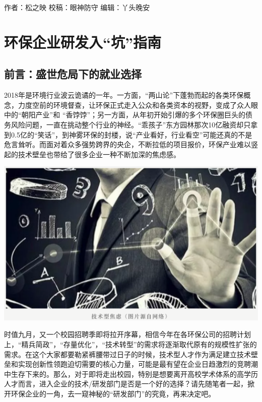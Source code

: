 \documentclass[]{book}
\begin{document}
作者：松之映
校稿：眼神防守
编辑：丫头晚安

\hypertarget{ux73afux4fddux4f01ux4e1aux7814ux53d1ux5165ux5751ux6307ux5357}{%
\section{环保企业研发入``坑''指南}\label{ux73afux4fddux4f01ux4e1aux7814ux53d1ux5165ux5751ux6307ux5357}}

\hypertarget{ux524dux8a00ux76dbux4e16ux5371ux5c40ux4e0bux7684ux5c31ux4e1aux9009ux62e9}{%
\subsection{前言：盛世危局下的就业选择}\label{ux524dux8a00ux76dbux4e16ux5371ux5c40ux4e0bux7684ux5c31ux4e1aux9009ux62e9}}

2018年是环境行业波云诡谲的一年。一方面，``两山论''下蓬勃而起的各类环保概念，力度空前的环境督查，让环保正式走入公众和各类资本的视野，变成了众人眼中的``朝阳产业''和 ``香饽饽''；另一方面，从年初开始引爆的多个环保圈巨头的债务风险问题，一直在挑动整个行业的神经。``乖孩子''东方园林那次10亿融资却只拿到0.5亿的``笑话''，到神雾环保的封楼，说``产业看好，行业看空''可能还真的不是危言耸听。而面对着众多强势跨界的央企，不断拉低的项目报价，环保产业难以竖起的技术壁垒也带给了很多企业一种不断加深的焦虑感。

\includegraphics[width=6.67in]{images/qiye1}

时值九月，又一个校园招聘季即将拉开序幕，相信今年在各环保公司的招聘计划上，``精兵简政''，``存量优化''，``技术转型''的需求将逐渐取代原有的规模性扩张的需求。在这个大家都要勒紧裤腰带过日子的时候，技术型人才作为满足建立技术壁垒和实现创新性领跑迫切需要的核心力量，可能是最有望在企业日趋激烈的竞聘潮中生存下来的。那么，对于即将走出校园，特别是想要离开高校学术体系的高学历人才而言，进入企业的技术/研发部门是否是一个好的选择？请先随笔者一起，掀开环保企业的一角，去一窥神秘的``研发部门''的究竟，再来决定吧。
\end{document}
